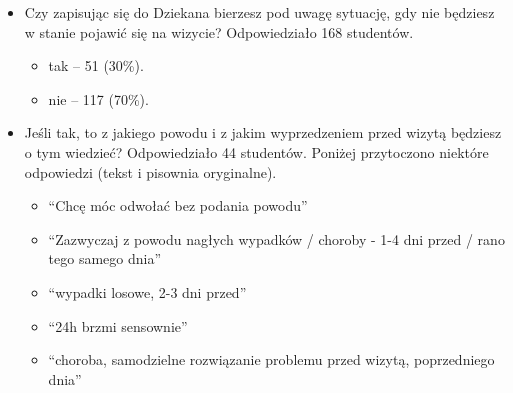 \documentclass[licencjacka]{pracamgr}
\begin{document}
\begin{itemize}
\item Czy zapisując się do Dziekana bierzesz pod uwagę sytuację, gdy nie będziesz w stanie pojawić się na wizycie?
Odpowiedziało 168 studentów.
\begin{itemize}
\setlength\itemsep{0,1em}

\item tak -- 51 (30\%).
\item nie -- 117 (70\%).
\end{itemize}

\item Jeśli tak, to z jakiego powodu i z jakim wyprzedzeniem przed wizytą będziesz o tym wiedzieć?
Odpowiedziało 44 studentów. Poniżej przytoczono niektóre odpowiedzi (tekst i pisownia oryginalne).
\begin{itemize}
\setlength\itemsep{0,1em}
\item \enquote{Chcę móc odwołać bez podania powodu}
\item \enquote{Zazwyczaj z powodu nagłych wypadków / choroby - 1-4 dni przed / rano tego samego dnia}
\item \enquote{wypadki losowe, 2-3 dni przed}
\item \enquote{24h brzmi sensownie}
\item \enquote{choroba, samodzielne rozwiązanie problemu przed wizytą, poprzedniego dnia}
\end{itemize}


\end{itemize}
\end{document}
